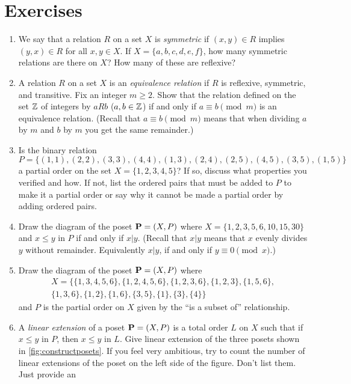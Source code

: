 \section{Exercises}\label{s:posets:exercises}

\begin{enumerate}
\item We say that a relation $R$ on a set $X$ is \textit{symmetric} if
  $(x,y)\in R$ implies $(y,x)\in R$ for all $x,y\in X$. If
  $X=\{a,b,c,d,e,f\}$, how many symmetric relations are there on $X$?
  How many of these are reflexive?
\item A relation $R$ on a set $X$ is an \textit{equivalence relation}
  if $R$ is reflexive, symmetric, and transitive. Fix an integer
  $m\geq 2$. Show that the relation defined on the set
  $\mathbb{Z}$ of integers by $aRb$ ($a,b\in\mathbb{Z}$) if and only if $a\equiv
  b\pmod{m}$ is an equivalence relation. (Recall that $a\equiv
  b\pmod{m}$ means that when dividing $a$ by $m$ and $b$ by $m$ you
  get the same remainder.)
\item Is the binary relation \[P=\{(1,1),(2,2),(3,3),(4,4),(1,3),(2,4),(2,5),(4,5),(3,5),(1,5)\}\] a partial
  order on the set $X=\{1,2,3,4,5\}$? If so, discuss what properties
  you verified and how. If not, list the ordered pairs that must be
  added to $P$ to make it a partial order or say why it cannot be made
  a partial order by adding ordered pairs.
\item Draw the diagram of the poset $\mathbf{P}=(X,P)$ where
  $X=\{1,2,3,5,6,10,15,30\}$ and $x\leq y$ in $P$ if and only if
  $x|y$. (Recall that $x|y$ means that $x$ evenly divides $y$ without
  remainder. Equivalently $x|y$, if and only if $y\equiv
  0\pmod{x}$.) \label{exer:posets:division}
\item Draw the diagram of the poset $\mathbf{P}=(X,P)$ where
 \begin{multline*}
    X=\{\{1,3,4,5,6\},\{1,2,4,5,6\},\{1,2,3,6\},\{1,2,3\},\{1,5,6\},\\\{1,3,6\},\{1,2\},\{1,6\},\{3,5\},\{1\},\{3\},\{4\}\}
  \end{multline*}
 and $P$ is the partial order on $X$ given by the ``is a subset of''
 relationship.
\item A \textit{linear extension} of a poset $\mathbf{P}=(X,P)$ is a total
  order $L$ on $X$ such that if $x\leq y$ in $P$, then $x\leq y$ in $L$. Give 
  linear extension of the three posets shown in \autoref{fig:constructposets}.
  If you feel very ambitious, try to count the number of linear extensions of
  the poset on the left side of the figure.  Don't list them.  Just provide an

\end{enumerate}
